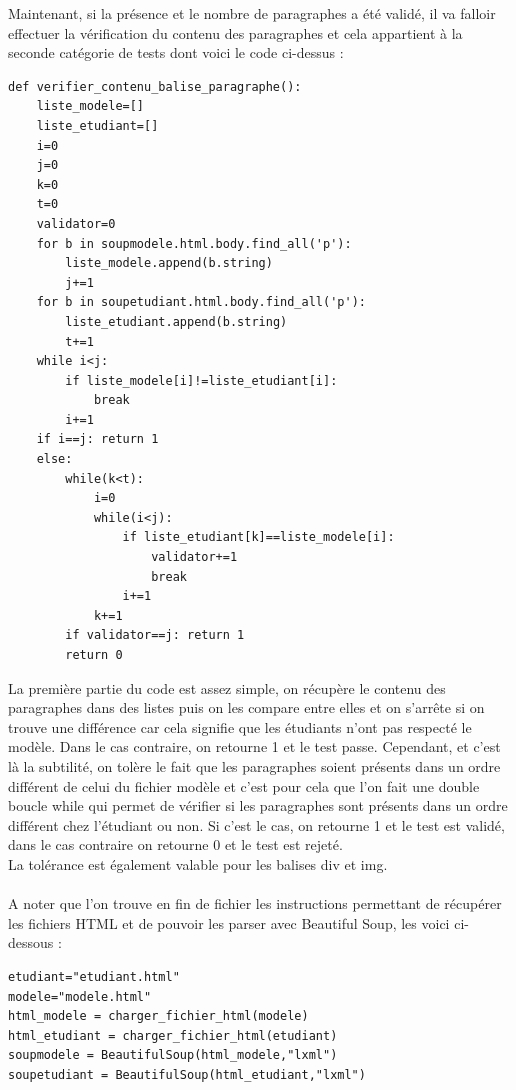 \documentclass[12pt,twoside]{book}
\begin{document}
Maintenant, si la présence et le nombre de paragraphes a été validé, il va falloir effectuer la vérification du contenu des paragraphes et cela appartient à la seconde catégorie de tests dont voici le code ci-dessus : \\
\begin{lstlisting}
def verifier_contenu_balise_paragraphe():
	liste_modele=[]
	liste_etudiant=[]
	i=0
	j=0
	k=0
	t=0
	validator=0
	for b in soupmodele.html.body.find_all('p'):
		liste_modele.append(b.string)
		j+=1
	for b in soupetudiant.html.body.find_all('p'):
		liste_etudiant.append(b.string)	
		t+=1	
	while i<j: 
		if liste_modele[i]!=liste_etudiant[i]:		
			break
		i+=1
	if i==j: return 1 
	else: 	
		while(k<t):
			i=0
			while(i<j): 
				if liste_etudiant[k]==liste_modele[i]: 
					validator+=1
					break
				i+=1
			k+=1
		if validator==j: return 1
		return 0
\end{lstlisting}
La première partie du code est assez simple, on récupère le contenu des paragraphes dans des listes puis on les compare entre elles et on s'arrête si on trouve une différence car cela signifie que les étudiants n'ont pas respecté le modèle. Dans le cas contraire, on retourne 1 et le test passe. Cependant, et c'est là la subtilité, on tolère le fait que les paragraphes soient présents dans un ordre différent de celui du fichier modèle et c'est pour cela que l'on fait une double boucle while qui permet de vérifier si les paragraphes sont présents dans un ordre différent chez l'étudiant ou non. Si c'est le cas, on retourne 1 et le test est validé, dans le cas contraire on retourne 0 et le test est rejeté.\\
La tolérance est également valable pour les balises div et img.\\ \\
A noter que l'on trouve en fin de fichier les instructions permettant de récupérer les fichiers HTML et de pouvoir les parser avec Beautiful Soup, les voici ci-dessous :\\
\begin{lstlisting}
etudiant="etudiant.html"
modele="modele.html"
html_modele = charger_fichier_html(modele)
html_etudiant = charger_fichier_html(etudiant)
soupmodele = BeautifulSoup(html_modele,"lxml")
soupetudiant = BeautifulSoup(html_etudiant,"lxml")
\end{lstlisting}
\end{document}

